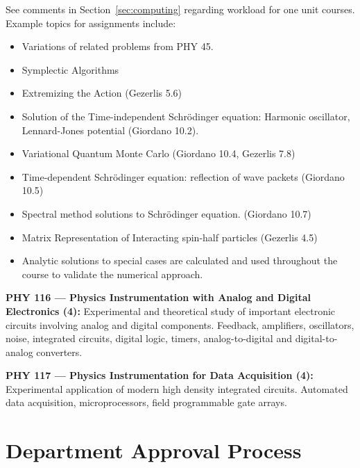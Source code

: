 \documentclass[12pt]{article}
\begin{document}
See comments in Section~\ref{sec:computing} regarding workload for one
unit courses.  Example topics for assignments include:
\begin{itemize}
\item Variations of related problems from PHY 45.
\item Symplectic Algorithms
\item Extremizing the Action (Gezerlis 5.6)
\item Solution of the Time-independent Schr\"odinger equation: 
  Harmonic oscillator, Lennard-Jones potential (Giordano 10.2).
\item Variational Quantum Monte Carlo (Giordano 10.4, Gezerlis 7.8)
\item Time-dependent Schr\"odinger equation:  reflection of wave packets (Giordano 10.5)
\item Spectral method solutions to Schr\"odinger equation.  (Giordano 10.7)
\item Matrix Representation of Interacting spin-half particles (Gezerlis 4.5)
\item Analytic solutions to special cases are calculated and used throughout the course to validate the numerical approach.
\end{itemize}





\vskip 1cm
\noindent
{\bf PHY 116 --- Physics Instrumentation with Analog and Digital Electronics (4):}  
Experimental and theoretical study of important electronic circuits
involving analog and digital components.  Feedback, amplifiers,
oscillators, noise, integrated circuits, digital logic, timers,
analog-to-digital and digital-to-analog converters.

\vskip 1cm
\noindent 
{\bf PHY 117 --- Physics Instrumentation for Data Acquisition (4):}  
Experimental application of modern high density integrated circuits.
Automated data acquisition,  microprocessors, field programmable gate arrays.

\newpage

\section{Department Approval Process}
\label{sec:approval}
\end{document}
